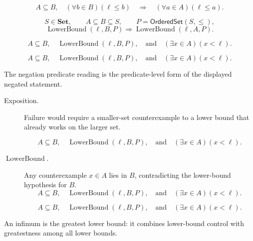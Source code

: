 \begin{remark*}
\[
  A\subseteq B,\quad
  (\forall b\in B)(\ell\leq b)
  \quad\Longrightarrow\quad
  (\forall a\in A)(\ell\leq a).
\]
\end{remark*}

\begin{remark*}
\[
  S\in\mathbf{Set},\qquad A\subseteq B\subseteq S,\qquad P=\mathsf{OrderedSet}(S,\leq),
\]
\[
  \operatorname{LowerBound}(\ell,B,P)
  \Longrightarrow \operatorname{LowerBound}(\ell,A,P).
\]
\end{remark*}

\begin{remark*}
\[
  A\subseteq B,\quad \operatorname{LowerBound}(\ell,B,P),
  \quad\text{and}\quad
  (\exists x\in A)(x<\ell).
\]
\end{remark*}

\begin{remark*}
\[
  A\subseteq B,\quad \operatorname{LowerBound}(\ell,B,P),
  \quad\text{and}\quad
  (\exists x\in A)(x<\ell).
\]

The negation predicate reading is the predicate-level form of the displayed negated statement.
\end{remark*}

\begin{remark*}
\begin{description}
  \item[Exposition.]
  Failure would require a smaller-set counterexample to a lower bound that
  already works on the larger set.

  
\[
A\subseteq B,\quad \operatorname{LowerBound}(\ell,B,P),
  \quad\text{and}\quad
  (\exists x\in A)(x<\ell).
\]
  \item[\(\operatorname{LowerBound}.\)]
  Any counterexample $x\in A$ lies in $B$, contradicting the lower-bound
  hypothesis for $B$.
  \[
    A\subseteq B,\quad \operatorname{LowerBound}(\ell,B,P),
    \quad\text{and}\quad
    (\exists x\in A)(x<\ell).
  \]

\[
    A\subseteq B,\quad \operatorname{LowerBound}(\ell,B,P),
    \quad\text{and}\quad
    (\exists x\in A)(x<\ell).
  \]
\end{description}
\end{remark*}

\begin{remark*}[Interpretation]
An infimum is the greatest lower bound: it combines lower-bound control with greatestness among all lower bounds.
\end{remark*}

